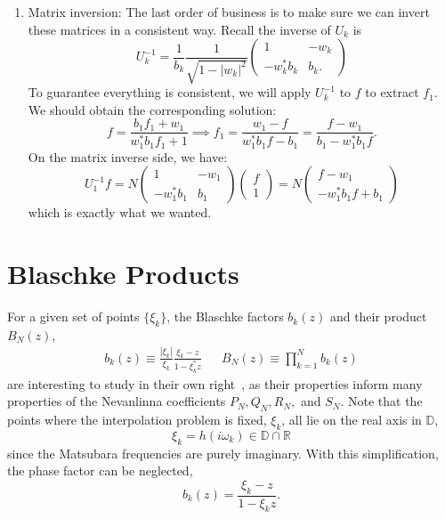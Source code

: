 \begin{appendices}
\begin{enumerate}
    \item Matrix inversion: The last order of business is to make sure we can invert these matrices in a consistent way. Recall the inverse of $U_k$ is
    \begin{equation}
        U_k^{-1} = \frac{1}{b_k} \frac{1}{\sqrt{1 - |w_k|^2}} \begin{pmatrix}
            1 & -w_k \\ -w_k^* b_k & b_k. 
        \end{pmatrix}
    \end{equation}
    To guarantee everything is consistent, we will apply $U_k^{-1}$ to $f$ to extract $f_1$. We should obtain the corresponding solution:
    \begin{equation}
        f = \frac{b_1 f_1 + w_1}{w_1^* b_1 f_1 + 1} \implies f_1 = \frac{w_1 - f}{w_1^* b_1 f - b_1} = \frac{f - w_1}{b_1 - w_1^* b_1 f}.
    \end{equation}
    On the matrix inverse side, we have:
    \begin{equation}
        U_1^{-1} f = N \begin{pmatrix}
            1 & -w_1 \\ -w_1^* b_1 & b_1
        \end{pmatrix} \begin{pmatrix}
            f \\ 1
        \end{pmatrix} = N \begin{pmatrix}
            f - w_1 \\ -w_1^* b_1 f + b_1
        \end{pmatrix}
    \end{equation}
    which is exactly what we wanted.
    
\end{enumerate}

\newpage
\section{Blaschke Products}
\label{app:blaschke}

For a given set of points $\{\xi_k\}$, the Blaschke factors $b_k(z)$ and their product $B_N(z)$,
\begin{align}
    b_k(z)\equiv \frac{|\xi_k|}{\xi_k} \frac{\xi_k - z}{1 - \xi_k^* z} && B_N(z) \equiv \prod_{k = 1}^N b_{k}(z)
\end{align}
are interesting to study in their own right~\cite{blaschke_products_book}, as their properties inform many properties of the Nevanlinna coefficients $P_N, Q_N, R_N,$ and $S_N$. Note that the points where the interpolation problem is fixed, $\xi_k$, all lie on the real axis in $\mathbb D$,
\begin{equation}
    \xi_k = h(i\omega_k)\in\mathbb D\cap \mathbb R
\end{equation}
since the Matsubara frequencies are purely imaginary. With this simplification, the phase factor can be neglected,
\begin{equation}
    b_k(z) = \frac{\xi_k - z}{1 - \xi_k z}.
\end{equation}


\end{appendices}

